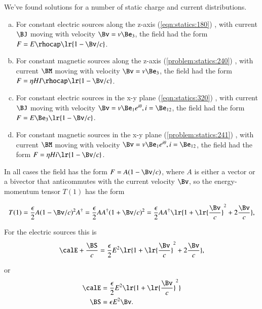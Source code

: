 %
%

We've found solutions for a number of static charge and current distributions.

\begin{enumerate}[(a)]
\item For constant electric sources along the z-axis
(\cref{eqn:statics:180})
, with current \( \BJ \) moving with velocity \( \Bv = v \Be_3 \), the field had the form \( F = E \rhocap \lr{ 1 - \Bv/c } \).
\item For constant magnetic sources along the z-axis
(\cref{problem:statics:240})
, with current \( \BM \) moving with velocity \( \Bv = v \Be_3 \), the field had the form \( F = \eta H I \rhocap \lr{ 1 - \Bv/c } \).
\item For constant electric sources in the x-y plane
(\cref{eqn:statics:320})
, with current \( \BJ \) moving with velocity \( \Bv = v \Be_1 e^{i\theta}, i = \Be_{12} \), the field had the form \( F = E \Be_3 \lr{ 1 - \Bv/c } \).
\item For constant magnetic sources in the x-y plane
(\cref{problem:statics:241})
, with current \( \BM \) moving with velocity \( \Bv = v \Be_1 e^{i\theta}, i = \Be_{12} \), the field had the form \( F = \eta H i \lr{ 1 - \Bv/c } \).
\end{enumerate}

In all cases the field has the form \( F = A ( 1 - \Bv/c ) \), where \( A \) is either a vector or a bivector that anticommutes with the current velocity \( \Bv \), so the energy-momentum tensor \( T(1) \) has the form

\begin{dmath}\label{eqn:poyntingF:860}
T(1)
= \frac{\epsilon}{2} A ( 1 - \Bv/c )^2 A^\dagger
= \frac{\epsilon}{2} A A^\dagger ( 1 + \Bv/c )^2
= \frac{\epsilon}{2} A A^\dagger \lr{ 1 + \lr{ \frac{\Bv}{c} }^2 + 2 \frac{\Bv}{c} },
\end{dmath}

For the electric sources this is
\begin{dmath}\label{eqn:poyntingF:880}
\calE + \frac{\BS}{c} = \frac{\epsilon}{2} E^2 \lr{ 1 + \lr{ \frac{\Bv}{c} }^2 + 2 \frac{\Bv}{c} },
\end{dmath}

or
\begin{dmath}\label{eqn:poyntingF:900}
\begin{aligned}
\calE &= \frac{\epsilon}{2} E^2 \lr{ 1 + \lr{ \frac{\Bv}{c} }^2 } \\
\BS &= \epsilon E^2 \Bv.
\end{aligned}
\end{dmath}


